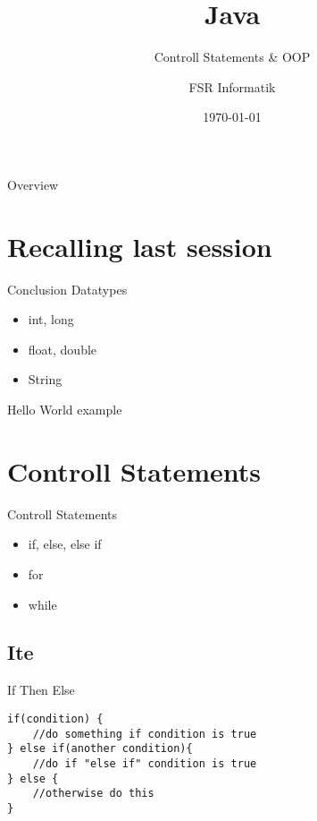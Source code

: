

\title{Java}
\subtitle{Controll Statements \& OOP}
\author{FSR Informatik}
\date{\today}

\def\tikzoverlay{%
   \tikz[baseline,overlay]\node[every overlay node]
}%




\begin{frame}
\titlepage
\end{frame}
\begin{frame}{Overview}
\tableofcontents
\end{frame}

\section{Recalling last session}
\begin{frame}{Conclusion}
	Datatypes
	\begin{itemize}
		\item int, long
		\item float, double
		\item String
	\end{itemize}
	Hello World example
\end{frame}

\section{Controll Statements}
\begin{frame}{Controll Statements}
	
	\begin{itemize}
		\item if, else, else if
		\item for
		\item while
	\end{itemize}
		
\end{frame}

\subsection{Ite}
\begin{frame}[fragile]{{\huge I}f {\huge T}hen {\huge E}lse}
\begin{lstlisting}
if(condition) {
	//do something if condition is true
} else if(another condition){
	//do if "else if" condition is true 
} else {
	//otherwise do this
}
\end{lstlisting}
\end{frame}

